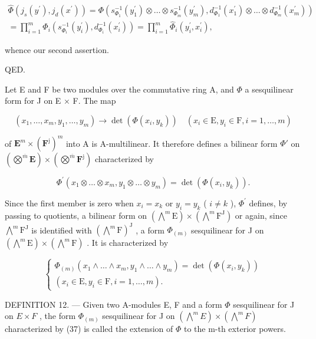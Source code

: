 \[
\begin{array}{l} \widehat {\Phi} (j _ {s} (y ^ {\prime}), j _ {d} (x ^ {\prime})) = \Phi (s _ {\Phi_ {1}} ^ {- 1} (y _ {1} ^ {\prime}) \otimes \dots \otimes s _ {\Phi_ {m}} ^ {- 1} (y _ {m} ^ {\prime}), d _ {\Phi_ {1}} ^ {- 1} (x _ {1} ^ {\prime}) \otimes \dots \otimes d _ {\Phi_ {m}} ^ {- 1} (x _ {m} ^ {\prime})) \\ = \prod_ {i = 1} ^ {m} \Phi_ {i} (s _ {\Phi_ {i}} ^ {- 1} (y _ {i} ^ {\prime}), d _ {\Phi_ {i}} ^ {- 1} (x _ {i} ^ {\prime})) = \prod_ {i = 1} ^ {m} \widehat {\Phi} _ {i} (y _ {i} ^ {\prime}, x _ {i} ^ {\prime}), \end{array}
\]

whence our second assertion.

QED.

Let E and F be two modules over the commutative ring A, and \(\Phi\) a sesquilinear form for J on E × F. The map

\[
(x _ {1}, \dots , x _ {m}, y _ {1}, \dots , y _ {m}) \rightarrow \det (\Phi (x _ {i}, y _ {k})) \quad (x _ {i} \in \mathrm{E}, y _ {i} \in \mathrm{F}, i = 1, \dots , m)
\]

of \(\mathbf{E}^{m}\times(\mathbf{F}^{\mathrm{j}})^{m}\) into A is A-multilinear. It therefore defines a bilinear form \(\Phi'\) on \((\bigotimes^{\overline{m}}\mathbf{E})\times(\bigotimes^{\overline{m}}\mathbf{F}^{\mathrm{j}})\) characterized by

\[
\Phi^ {\prime} (x _ {1} \otimes \dots \otimes x _ {m}, y _ {1} \otimes \dots \otimes y _ {m}) = \det (\Phi (x _ {i}, y _ {k})).
\]

Since the first member is zero when \(x_{i}=x_{k}\) or \(y_{i}=y_{k}\) ( \(i\neq k\) ), \(\Phi^{\prime}\) defines, by passing to quotients, a bilinear form on \((\bigwedge^{m}\mathrm{E})\times(\bigwedge^{m}\mathrm{F}^{\mathrm{J}})\) or again, since \(\bigwedge^{m}\mathrm{F}^{\mathrm{J}}\) is identified with \((\bigwedge^{m}\mathrm{F})^{\mathrm{J}}\) , a form \(\Phi_{(m)}\) sesquilinear for J on \((\bigwedge^{m}\mathrm{E})\times(\bigwedge^{m}\mathrm{F})\) . It is characterized by

\[
\left\{ \begin{array}{l} \Phi_ {(m)} (x _ {1} \wedge \dots \wedge x _ {m}, y _ {1} \wedge \dots \wedge y _ {m}) = \det (\Phi (x _ {i}, y _ {k})) \\ (x _ {i} \in \mathrm{E}, y _ {i} \in \mathrm{F}, i = 1, \dots , m). \end{array} \right.\tag{37}
\]

DEFINITION 12. --- Given two A-modules E, F and a form \(\Phi\) sesquilinear for J on \(E \times F\) , the form \(\Phi_{(m)}\) sesquilinear for J on \((\bigwedge^{m} E) \times (\bigwedge^{m} F)\) characterized by (37) is called the extension of \(\Phi\) to the m-th exterior powers.

